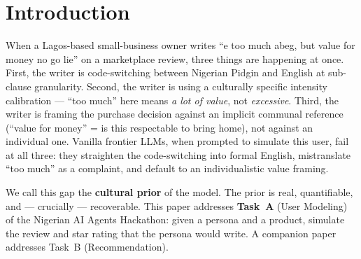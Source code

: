 \documentclass[sigconf,nonacm,balance]{acmart}
\begin{document}
\section{Introduction}

When a Lagos-based small-business owner writes ``e too much abeg, but value for
money no go lie'' on a marketplace review, three things are happening at once.
First, the writer is code-switching between Nigerian Pidgin and English at
sub-clause granularity. Second, the writer is using a culturally specific
intensity calibration --- ``too much'' here means \emph{a lot of value}, not
\emph{excessive}. Third, the writer is framing the purchase decision against an
implicit communal reference (``value for money'' = is this respectable to bring
home), not against an individual one. Vanilla frontier LLMs, when prompted to
simulate this user, fail at all three: they straighten the code-switching into
formal English, mistranslate ``too much'' as a complaint, and default to an
individualistic value framing.

We call this gap the \textbf{cultural prior} of the model. The prior is real,
quantifiable, and --- crucially --- recoverable. This paper addresses
\textbf{Task~A} (User Modeling) of the Nigerian AI Agents Hackathon: given a
persona and a product, simulate the review and star rating that the persona
would write. A companion paper addresses Task~B (Recommendation).
\end{document}
